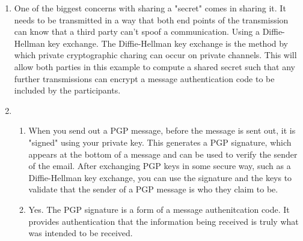 \begin{enumerate}
    \item One of the biggest concerns with sharing a "secret" comes in sharing it. It needs to be transmitted in a way that both end points of the transmission can know that a third party can't spoof a communication. Using a Diffie-Hellman key exchange. The Diffie-Hellman key exchange is the method by which private cryptographic charing can occur on private channels. This will allow both parties in this example to compute a shared secret such that any further transmissions can encrypt a message authentication code to be included by the participants.

    \item\begin{enumerate}
        \item When you send out a PGP message, before the message is sent out, it is "signed" using your private key. This generates a PGP signature, which appears at the bottom of a message and can be used to verify the sender of the email. After exchanging PGP keys in some secure way, such as a Diffie-Hellman key exchange, you can use the signature and the keys to validate that the sender of a PGP message is who they claim to be.

        \item Yes. The PGP signature is a form of a message authenitcation code. It provides authentication that the information being received is truly what was intended to be received.
    \end{enumerate}

\end{enumerate}

